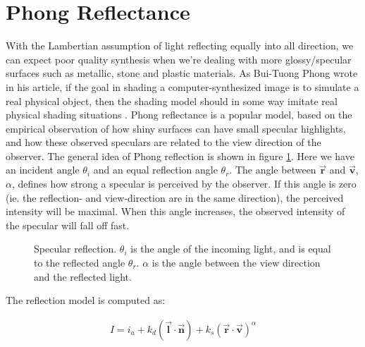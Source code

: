 	\section{Phong Reflectance}\label{Phong}
		With the Lambertian assumption of light reflecting equally into all direction, we can expect poor quality synthesis when we're dealing with more glossy/specular surfaces such as metallic, stone and plastic materials. As Bui-Tuong Phong wrote in his article, if the goal in shading a computer-synthesized image is to simulate a real physical object, then the shading model should in some way imitate real physical shading situations \cite{Phong}. Phong reflectance is a popular model, based on the empirical observation of how shiny surfaces can have small specular highlights, and how these observed speculars are related to the view direction of the observer.
The general idea of Phong reflection is shown in figure \ref{fig:SPECULAR1}. Here we have an incident angle $\theta_i$ and an equal reflection angle $\theta_r$. The angle between $\vec{\mathbf{r}}$ and $\vec{\mathbf{v}}$, $\alpha$, defines how strong a specular is perceived by the observer. If this angle is zero (ie. the reflection- and view-direction are in the same direction), the perceived intensity will be maximal. When this angle increases, the observed intensity of the specular will fall off fast.

\begin{figure}[H]
	\begin{center}
	\end{center}
	\caption{Specular reflection. $\theta_i$ is the angle of the incoming light, and is equal to the reflected angle $\theta_r$. $\alpha$ is the angle between the view direction and the reflected light.}
	\label{fig:SPECULAR1}
\end{figure}


\noindent The reflection model is computed as:

	\begin{eqnarray*}
		I = i_a + k_d(\vec{\mathbf{l}} \cdot \vec{\mathbf{n}}) + k_s(\vec{\mathbf{r}} \cdot \vec{\mathbf{v}})^\alpha
	\end{eqnarray*}

